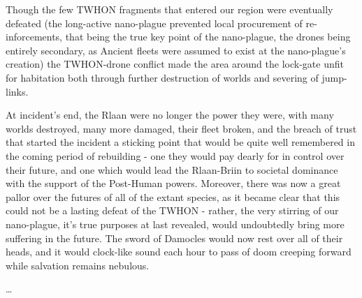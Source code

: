 Though the few TWHON fragments that entered our region were eventually defeated (the long-active nano-plague prevented local procurement of re-inforcements, that being the true key point of the nano-plague, the drones being entirely secondary, as Ancient fleets were assumed to exist at the nano-plague's creation) the TWHON-drone conflict made the area around the lock-gate unfit for habitation both through further destruction of worlds and severing of jump-links. 

At incident's end, the Rlaan were no longer the power they were, with many worlds destroyed, many more damaged, their fleet broken, and the breach of trust that started the incident a sticking point that would be quite well remembered in the coming period of rebuilding - one they would pay dearly for in control over their future, and one which would lead the Rlaan-Briin to societal dominance with the support of the Post-Human powers. Moreover, there was now a great pallor over the futures of all of the extant species, as it became clear that this could not be a lasting defeat of the TWHON - rather, the very stirring of our nano-plague, it's true purposes at last revealed, would undoubtedly bring more suffering in the future. The sword of Damocles would now rest over all of their heads, and it would clock-like sound each hour to pass of doom creeping forward while salvation remains nebulous.

…

